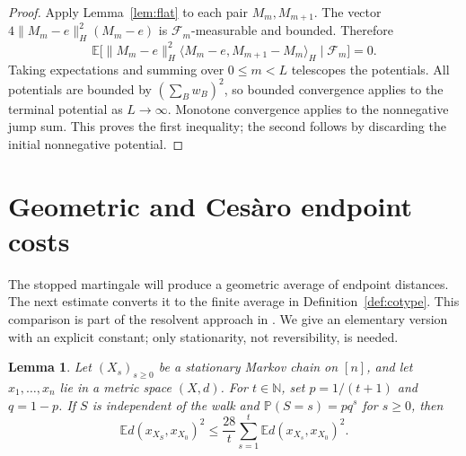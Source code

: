 \documentclass[11pt]{article}
\newtheorem{lemma}[theorem]{Lemma}
\theoremstyle{definition}
\theoremstyle{remark}
\numberwithin{equation}{section}
\newcommand{\N}{\mathbb N}
\newcommand{\E}{\mathbb E}
\newcommand{\Prob}{\mathbb P}
\newcommand{\calF}{\mathcal F}
\begin{document}
\begin{proof}
Apply Lemma~\ref{lem:flat} to each pair $M_m,M_{m+1}$.
The vector $4\|M_m-e\|_H^2(M_m-e)$ is
$\calF_m$-measurable and bounded. Therefore
\[
 \E\bigl[\|M_m-e\|_H^2
       \langle M_m-e,M_{m+1}-M_m\rangle_H\mid\calF_m\bigr]=0.
\]
Taking expectations and summing over $0\leq m<L$ telescopes
the potentials. All potentials are bounded by
$(\sum_Bw_B)^2$, so bounded convergence applies to the terminal
potential as $L\to\infty$. Monotone convergence applies to the
nonnegative jump sum. This proves the first inequality; the
second follows by discarding the initial nonnegative potential.
\end{proof}

\section{Geometric and Ces\`aro endpoint costs}
\label{sec:comparison}

The stopped martingale will produce a geometric average of
endpoint distances. The next estimate converts it to the finite
average in Definition~\ref{def:cotype}. This comparison is part
of the resolvent approach in \cite[Section~7, especially
Lemma~7.1]{MendelNaor13}. We give an elementary version with an
explicit constant; only stationarity, not reversibility, is needed.

\begin{lemma}\label{lem:comparison}
Let $(X_s)_{s\geq0}$ be a stationary Markov chain on $[n]$,
and let $x_1,\ldots,x_n$ lie in a metric space $(X,d)$.
For $t\in\N$, set $p=1/(t+1)$ and $q=1-p$. If $S$ is
independent of the walk and $\Prob(S=s)=pq^s$ for $s\geq0$,
then
\begin{equation}\label{eq:comparison}
 \E d(x_{X_S},x_{X_0})^2
 \leq\frac{28}{t}\sum_{s=1}^t
                 \E d(x_{X_s},x_{X_0})^2.
\end{equation}
\end{lemma}
\end{document}

